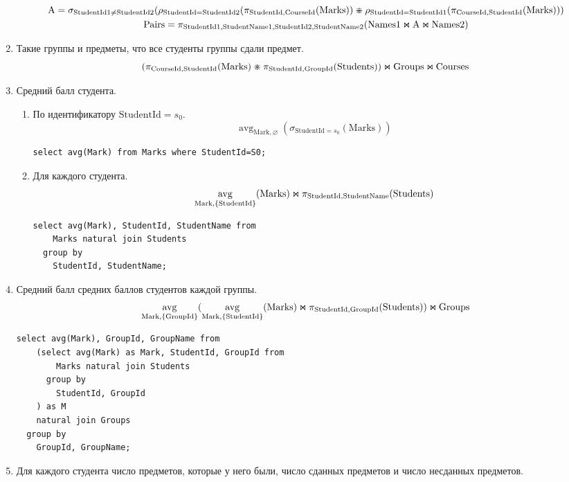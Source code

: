 \documentclass{article}
\DeclareMathOperator{\avg}{avg}
\newcommand{\Students}{\mathrm{Students}}
\newcommand{\StudentId}{\mathrm{StudentId}}
\newcommand{\StudentName}{\mathrm{StudentName}}
\newcommand{\Groups}{\mathrm{Groups}}
\newcommand{\GroupId}{\mathrm{GroupId}}
\newcommand{\Courses}{\mathrm{Courses}}
\newcommand{\CourseId}{\mathrm{CourseId}}
\newcommand{\Marks}{\mathrm{Marks}}
\newcommand{\Mark}{\mathrm{Mark}}
\newcommand{\join}{\mathbin{\mathrlap{\ltimes}{\rtimes}}}
\begin{document}
\begin{enumerate}
\begin{gather*}
        \mathrm{A} =
            \sigma_{\mathrm{StudentId1} \neq \mathrm{StudentId2}}(
            \rho_{\StudentId=\mathrm{StudentId2}}(\pi_{\StudentId, \CourseId}(\Marks))
            \divideontimes
            \rho_{\StudentId=\mathrm{StudentId1}}(\pi_{\CourseId, \StudentId}(\Marks))) \\
        \mathrm{Pairs} = \pi_{\mathrm{StudentId1},\mathrm{StudentName1},
             \mathrm{StudentId2},\mathrm{StudentName2}}(
        \mathrm{Names1} \join \mathrm{A} \join \mathrm{Names2}
        )
    \end{gather*}
    \item Такие группы и предметы, что все студенты группы сдали предмет.
    \[
        (\pi_{\CourseId, \StudentId}(\Marks) \divideontimes
        \pi_{\StudentId, \GroupId}(\Students))
        \join \Groups \join \Courses
    \]
    \item Средний балл студента.
    \begin{enumerate}
        \item По идентификатору $\StudentId=s_0$.
        \[
            \avg_{\Mark, \varnothing}(\sigma_{\StudentId=s_0}(\Marks))
        \]
        \begin{verbatim}
select avg(Mark) from Marks where StudentId=S0;
        \end{verbatim}
        \item Для каждого студента.
        \[
            \avg_{\Mark, \{\StudentId\}}(\Marks)
            \join \pi_{\StudentId, \StudentName}(\Students)
        \]
        \begin{verbatim}
select avg(Mark), StudentId, StudentName from
    Marks natural join Students
  group by
    StudentId, StudentName;
        \end{verbatim}
    \end{enumerate}
    \item Средний балл средних баллов студентов каждой группы.
    \[
        \avg_{\Mark, \{\GroupId\}}(
        \avg_{\Mark, \{\StudentId\}}(\Marks)
        \join \pi_{\StudentId, \GroupId}(\Students))
        \join \Groups
    \]
    \begin{verbatim}
select avg(Mark), GroupId, GroupName from
    (select avg(Mark) as Mark, StudentId, GroupId from
        Marks natural join Students
      group by
        StudentId, GroupId
    ) as M
    natural join Groups
  group by
    GroupId, GroupName;
    \end{verbatim}
    \item Для каждого студента число предметов, которые у него были, число сданных предметов и число несданных предметов.

\end{enumerate}
\end{document}
